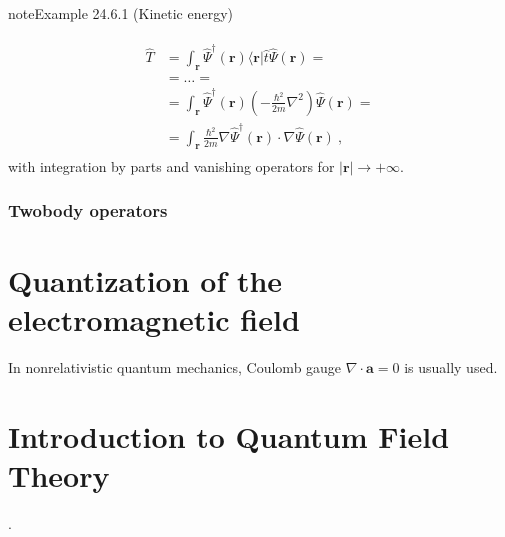 \documentclass[letterpaper,10pt,english]{jupyterBook}
\begin{document}
\begin{sphinxadmonition}{note}{Example 24.6.1 (Kinetic energy)}


\begin{equation*}
\begin{split}\begin{aligned}
 \hat{T}
 & = \int_{\mathbf{r}} \hat{\Psi}^\dagger(\mathbf{r}) \langle \mathbf{r} | \hat{t} \hat{\Psi}(\mathbf{r}) = \\
 & = \dots = \\
 & = \int_{\mathbf{r}} \hat{\Psi}^\dagger(\mathbf{r}) \left( - \frac{\hbar^2}{2m} \nabla^2 \right) \hat{\Psi}(\mathbf{r}) = \\
 & = \int_{\mathbf{r}} \frac{\hbar^2}{2m} \nabla \hat{\Psi}^\dagger(\mathbf{r}) \cdot \nabla \hat{\Psi}(\mathbf{r}) \ ,
\end{aligned}\end{split}
\end{equation*}
\sphinxAtStartPar
with integration by parts and vanishing operators for \(|\mathbf{r}| \rightarrow + \infty\).
\end{sphinxadmonition}


\subsection{Two\sphinxhyphen{}body operators}
\label{\detokenize{ch/quantum-mechanics/many-body/operators:two-body-operators}}\label{\detokenize{ch/quantum-mechanics/many-body/operators:quantum-mechanics-second-quantizazion-operators-two-body}}
\sphinxstepscope


\chapter{Quantization of the electromagnetic field}
\label{\detokenize{ch/quantum-mechanics/many-body/electromagnetic-field-quantization:quantization-of-the-electromagnetic-field}}\label{\detokenize{ch/quantum-mechanics/many-body/electromagnetic-field-quantization:quantum-mechanics-electromagnetic-field-quantization}}\label{\detokenize{ch/quantum-mechanics/many-body/electromagnetic-field-quantization::doc}}
\sphinxAtStartPar
In non\sphinxhyphen{}relativistic quantum mechanics, Coulomb gauge \(\nabla \cdot \mathbf{a} = 0\) is usually used.

\sphinxstepscope


\chapter{Introduction to Quantum Field Theory}
\label{\detokenize{ch/quantum-mechanics/qft:introduction-to-quantum-field-theory}}\label{\detokenize{ch/quantum-mechanics/qft:quantum-mechanics-qft}}\label{\detokenize{ch/quantum-mechanics/qft::doc}}
\sphinxAtStartPar
{\hyperref[\detokenize{ch/quantum-mechanics/qft/harmonic-oscillator:quantum-mechanics-qft-harmonic-oscillator}]{}}.
\end{document}
